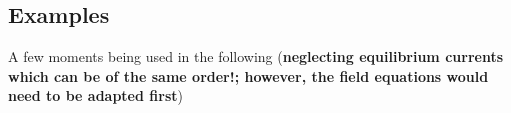 \documentclass[12pt]{article}
\begin{document}
\subsection{Examples}
A few moments being used in the following 
({\bf neglecting equilibrium currents which can be of the same order!; 
however, the field equations would need to be adapted first})
\end{document}
